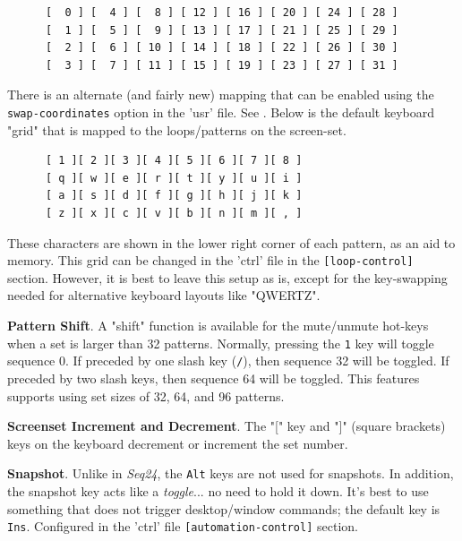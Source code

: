    \begin{verbatim}
      [  0 ] [  4 ] [  8 ] [ 12 ] [ 16 ] [ 20 ] [ 24 ] [ 28 ]
      [  1 ] [  5 ] [  9 ] [ 13 ] [ 17 ] [ 21 ] [ 25 ] [ 29 ]
      [  2 ] [  6 ] [ 10 ] [ 14 ] [ 18 ] [ 22 ] [ 26 ] [ 30 ]
      [  3 ] [  7 ] [ 11 ] [ 15 ] [ 19 ] [ 23 ] [ 27 ] [ 31 ]
   \end{verbatim}

   There is an alternate (and fairly new) mapping that can be enabled
   using the \texttt{swap-coordinates} option in the 'usr' file.
   See .
   Below is the default keyboard "grid" that is
   mapped to the loops/patterns on the screen-set.

   \begin{verbatim}
      [ 1 ][ 2 ][ 3 ][ 4 ][ 5 ][ 6 ][ 7 ][ 8 ]
      [ q ][ w ][ e ][ r ][ t ][ y ][ u ][ i ]
      [ a ][ s ][ d ][ f ][ g ][ h ][ j ][ k ]
      [ z ][ x ][ c ][ v ][ b ][ n ][ m ][ , ]
   \end{verbatim}

   These characters are shown in the lower right corner of each
   pattern, as an aid to memory.
   This grid can be changed in the 'ctrl' file in the
   \texttt{[loop-control]} section.
   However, it is best to leave this setup as is, except for the key-swapping
   needed for alternative keyboard layouts like "QWERTZ".

   \textbf{Pattern Shift}.
   A "shift" function is available for the
   mute/unmute hot-keys when a set is larger than 32 patterns.
   Normally, pressing the \texttt{1} key will toggle
   sequence 0.  If preceded by one slash key (\texttt{/}), then sequence 32
   will be toggled.  If preceded by two slash keys, then sequence 64 will be
   toggled.  This features supports using set sizes of 32, 64, and 96 patterns.

   \index{keys![}
   \textbf{Screenset Increment and Decrement}.
   \index{keys!]}
   The "[" key and "]" (square brackets) keys
   on the keyboard decrement or increment the set number.

   \textbf{Snapshot}.
   Unlike in \textsl{Seq24}, the \texttt{Alt} keys are not used for snapshots.
   In addition, the snapshot key acts like a \textsl{toggle}...
   no need to hold it down.
   It's best to use something that does not trigger desktop/window
   commands; the default key is \texttt{Ins}.
   Configured in the 'ctrl' file \texttt{[automation-control]} section.

